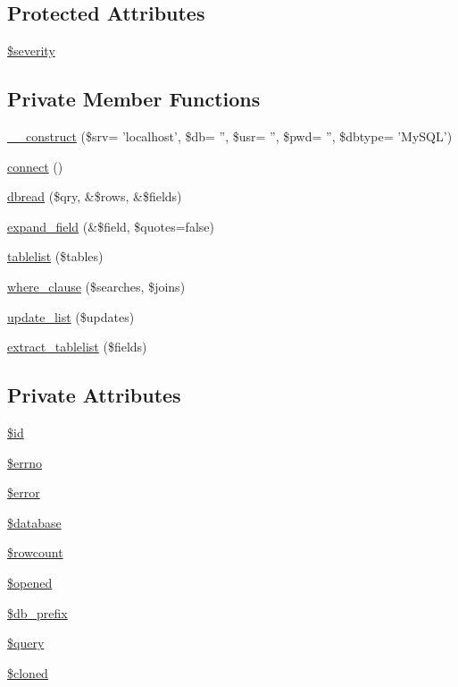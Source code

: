 \subsection*{Protected Attributes}
\begin{DoxyCompactItemize}
\item 
\hyperlink{class__OWL_ad26b40a9dbbacb33e299b17826f8327c}{\$severity}
\end{DoxyCompactItemize}
\subsection*{Private Member Functions}
\begin{DoxyCompactItemize}
\item 
\hyperlink{classDbHandler_ae54e9d4643f41a9296167086f6a769fc}{\_\-\_\-construct} (\$srv= 'localhost', \$db= '', \$usr= '', \$pwd= '', \$dbtype= 'MySQL')
\item 
\hyperlink{classDbHandler_a9cf52ba614981a0082063d57290d3b7c}{connect} ()
\item 
\hyperlink{classDbHandler_a130e49aa639fecb46ce6719ddcb0d72f}{dbread} (\$qry, \&\$rows, \&\$fields)
\item 
\hyperlink{classDbHandler_a7896419cf143412ad74ca8fccb11fb6e}{expand\_\-field} (\&\$field, \$quotes=false)
\item 
\hyperlink{classDbHandler_a2b6376ab821eb4aa2f086d852099c6c1}{tablelist} (\$tables)
\item 
\hyperlink{classDbHandler_a7715991ea990f6610a95844bebd75800}{where\_\-clause} (\$searches, \$joins)
\item 
\hyperlink{classDbHandler_aa734a4d3767057b811be5b4621d55cdd}{update\_\-list} (\$updates)
\item 
\hyperlink{classDbHandler_af7a315d2a47dc9f2d2f897ca87981c00}{extract\_\-tablelist} (\$fields)
\end{DoxyCompactItemize}
\subsection*{Private Attributes}
\begin{DoxyCompactItemize}
\item 
\hyperlink{classDbHandler_ad38e1c3312815c8ad4093957881092ff}{\$id}
\item 
\hyperlink{classDbHandler_af6e9f493be56617cb533763bb2a0e85a}{\$errno}
\item 
\hyperlink{classDbHandler_ade79e11156abbfc180864beb5b9df377}{\$error}
\item 
\hyperlink{classDbHandler_afaac5248f9ee59786b48a7b51f318940}{\$database}
\item 
\hyperlink{classDbHandler_a56a7ae4bd7d842c85f3fe8052aecbfef}{\$rowcount}
\item 
\hyperlink{classDbHandler_a71e36ffbff0d157b1d91dc000bc6f821}{\$opened}
\item 
\hyperlink{classDbHandler_a19af96598e7f72673fc5da26ad77731b}{\$db\_\-prefix}
\item 
\hyperlink{classDbHandler_ad671b5596b37dac6d48a660a07775965}{\$query}
\item 
\hyperlink{classDbHandler_a6fc74f6785f349ab442f33ce31f46e63}{\$cloned}
\end{DoxyCompactItemize}
